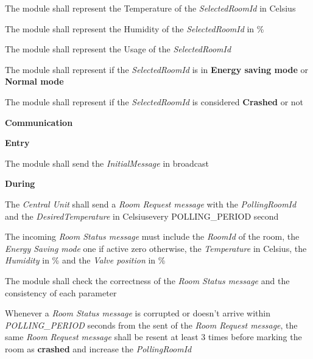 \begin{req_enum}
\begin{req_enum}[label*=\arabic*.]
\begin{req_enum}[label*=\arabic*.]
\begin{req_enum}[label*=\arabic*.]
								\item The module shall represent the Temperature of the \textit{SelectedRoomId} in Celsius\degree \\
								\item The module shall represent the Humidity of the \textit{SelectedRoomId} in \% \\
								\item The module shall represent the Usage of the \textit{SelectedRoomId} \\
								\item The module shall represent if the \textit{SelectedRoomId} is in \textbf{Energy saving mode} or \textbf{Normal mode} \\
								\item The module shall represent if the \textit{SelectedRoomId} is considered \textbf{Crashed} or not\\
							\end{req_enum}
						\end{req_enum}
					\end{req_enum}
			\item \textbf{Communication}
				\begin{req_enum}[label*=\arabic*.]
					\item \textbf{Entry}
						\begin{req_enum}[label*=\arabic*.]
							\item The module shall send the \textit{InitialMessage} in broadcast
						\end{req_enum}	
					\item \textbf{During}
						\begin{req_enum}[label*=\arabic*.]
							\item The \textit{Central Unit} shall send a \textit{Room Request message} with the \textit{PollingRoomId} and the \textit{DesiredTemperature} in Celsius\degree every POLLING\_PERIOD   second
							\item The incoming \textit{Room Status message} must include the \textit{RoomId} of the room, the \textit{Energy Saving mode} one if active zero otherwise, the \textit{Temperature} in Celsius\degree, the \textit{Humidity} in \% and the \textit{Valve position} in \%
							\item The module shall check the correctness of the \textit{Room Status message} and the consistency of each parameter
							\item Whenever a \textit{Room Status message} is corrupted or doesn't arrive within \textit{POLLING\_PERIOD}  seconds from the sent of the \textit{Room Request message}, the same \textit{Room Request message} shall be resent at least 3 times before marking the room as \textbf{crashed} and increase the \textit{PollingRoomId}

\end{req_enum}
\end{req_enum}
\end{req_enum}
